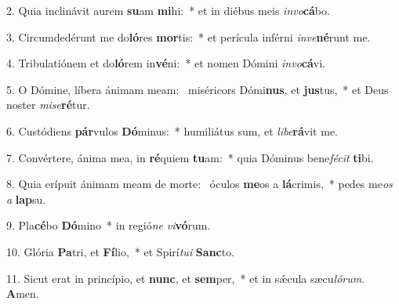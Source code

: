 2. Quia inclinávit aurem \textbf{su}am \textbf{mi}hi:~*  et in diébus meis \textit{in}\textit{vo}\textbf{cá}bo.\

3. Circumdedérunt me do\textbf{ló}res \textbf{mor}tis:~*  et perícula inférni \textit{in}\textit{ve}\textbf{né}runt me.\

4. Tribulatiónem et do\textbf{ló}rem in\textbf{vé}ni:~*  et nomen Dómini \textit{in}\textit{vo}\textbf{cá}vi.\

5. O Dómine, líbera ánimam meam: \dag\  miséricors Dómi\textbf{nus}, et \textbf{jus}tus,~*  et Deus noster \textit{mi}\textit{se}\textbf{ré}tur.\

6. Custódiens \textbf{pár}vulos \textbf{Dó}minus:~*  humiliátus sum, et \textit{li}\textit{be}\textbf{rá}vit me.\

7. Convértere, ánima mea, in \textbf{ré}quiem \textbf{tu}am:~*  quia Dóminus bene\textit{fé}\textit{cit} \textbf{ti}bi.\

8. Quia erípuit ánimam meam de morte: \dag\  óculos \textbf{me}os a \textbf{lá}crimis,~*  pedes me\textit{os} \textit{a} \textbf{lap}su.\

9. Pla\textbf{cé}bo \textbf{Dó}mino~*  in regió\textit{ne} \textit{vi}\textbf{vó}rum.\

10. Glória \textbf{Pa}tri, et \textbf{Fí}lio,~*  et Spirí\textit{tu}\textit{i} \textbf{Sanc}to.\

11. Sicut erat in princípio, et \textbf{nunc}, et \textbf{sem}per,~*  et in sǽcula sæcu\textit{ló}\textit{rum}. \textbf{A}men.\

